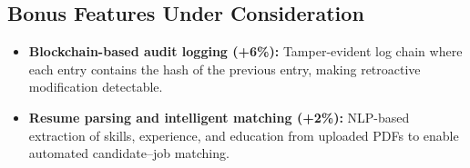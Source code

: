 \subsection{Bonus Features Under Consideration}

\begin{itemize}
    \item \textbf{Blockchain-based audit logging (+6\%):} Tamper-evident log chain where each entry contains the hash of the previous entry, making retroactive modification detectable.
    \item \textbf{Resume parsing and intelligent matching (+2\%):} NLP-based extraction of skills, experience, and education from uploaded PDFs to enable automated candidate–job matching.
\end{itemize}
